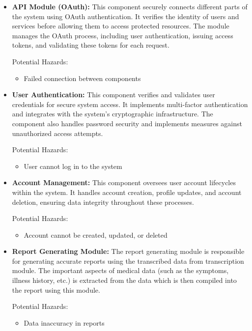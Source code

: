 \documentclass{article}
\begin{document}
\begin{itemize}
    \item \textbf{API Module (OAuth):}
    This component securely connects different parts of the system using OAuth authentication. It verifies the identity of users and services before allowing them to access protected resources. The module manages the OAuth process, including user authentication, issuing access tokens, and validating these tokens for each request.
    
    Potential Hazards:
    \begin{itemize}
        \item Failed connection between components
    \end{itemize}
    
    \item \textbf{User Authentication:}
    This component verifies and validates user credentials for secure system access. It implements multi-factor authentication and integrates with the system's cryptographic infrastructure. The component also handles password security and implements measures against unauthorized access attempts.
    
    Potential Hazards:
    \begin{itemize}
        \item User cannot log in to the system
    \end{itemize}
    
    \item \textbf{Account Management:}
    This component oversees user account lifecycles within the system. It handles account creation, profile updates, and account deletion, ensuring data integrity throughout these processes.
    
    Potential Hazards:
    \begin{itemize}
        \item Account cannot be created, updated, or deleted
    \end{itemize}
    
    \item \textbf{Report Generating Module:}
    The report generating module is responsible for generating accurate reports using the transcribed data from transcription module. The important aspects of medical data (such as the symptoms, illness history, etc.) is extracted from the data which is then compiled into the report using this module.

    Potential Hazards:
    \begin{itemize}
        \item Data inaccuracy in reports
    \end{itemize}


\end{itemize}
\end{document}
